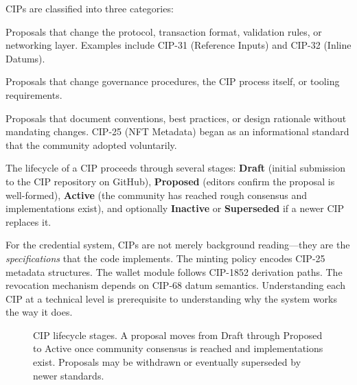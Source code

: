 CIPs are classified into three categories:

\begin{description}[leftmargin=1.5em, style=nextline]
  \item[Standards Track] Proposals that change the protocol, transaction
    format, validation rules, or networking layer.  Examples include CIP-31
    (Reference Inputs) and CIP-32 (Inline Datums).
  \item[Process] Proposals that change governance procedures, the CIP process
    itself, or tooling requirements.
  \item[Informational] Proposals that document conventions, best practices, or
    design rationale without mandating changes.  CIP-25 (NFT Metadata) began
    as an informational standard that the community adopted voluntarily.
\end{description}

The lifecycle of a CIP proceeds through several stages: \textbf{Draft} (initial
submission to the CIP repository on GitHub), \textbf{Proposed} (editors
confirm the proposal is well-formed), \textbf{Active} (the community has
reached rough consensus and implementations exist), and optionally
\textbf{Inactive} or \textbf{Superseded} if a newer CIP replaces it.

For the credential system, CIPs are not merely background reading---they are
the \emph{specifications} that the code implements.  The minting policy encodes
CIP-25 metadata structures.  The wallet module follows CIP-1852 derivation
paths.  The revocation mechanism depends on CIP-68 datum semantics.
Understanding each CIP at a technical level is prerequisite to understanding
why the system works the way it does.

\begin{figure}[ht]
\centering
{}
\caption{CIP lifecycle stages.  A proposal moves from Draft through Proposed
to Active once community consensus is reached and implementations exist.
Proposals may be withdrawn or eventually superseded by newer standards.}
\label{fig:cip-lifecycle}
\end{figure}


